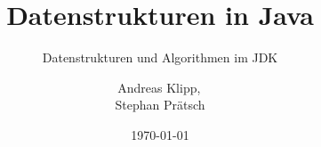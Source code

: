 \documentclass{beamer}
\begin{document}
\title{Datenstrukturen in Java}
\subtitle{Datenstrukturen und Algorithmen im JDK}
\author{Andreas Klipp,\, \\Stephan Prätsch}
\institute{}
\date{\today} 

\frame{\titlepage}









\end{document}
